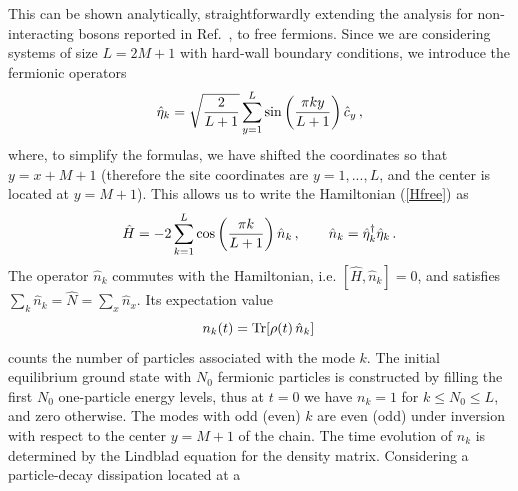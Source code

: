   This can be shown analytically, straightforwardly extending the
  analysis for non-interacting bosons reported in Ref.~\cite{KH-12}, to
  free fermions.  Since we are considering systems of size $L=2M+1$ with
  hard-wall boundary conditions, we introduce the fermionic operators
  \begin{eqnarray}
    \hat \eta_k = \sqrt{2\over L+1}
    \sum_{y=1}^{L} \sin\left({\pi k y \over L+1}\right)
    \hat c_y\,, \label{trafou}
  \end{eqnarray}
  where, to simplify the formulas, we have shifted the coordinates so
  that $y = x + M+1$ (therefore the site coordinates are $y=1,...,L$,
  and the center is located at $y=M+1$).  This allows us to write the
  Hamiltonian (\ref{Hfree}) as
  \begin{equation}
    \hat H = - 2 \sum_{k=1}^L \cos\left({\pi k\over L+1}\right) \hat n_k\,,
    \qquad   \hat n_k = \hat \eta_k^\dagger \hat \eta_k\,.
    \label{Hfreek}
    \end{equation}
  The operator $\hat n_k$ commutes with the Hamiltonian, i.e. $[\hat
    H,\hat n_k] = 0$, and satisfies $\sum_k \hat n_k = \hat N = \sum_x
  \hat n_x$.  Its expectation value 
  \begin{equation}
  n_k(t) = {\rm Tr}[\rho(t)\, \hat n_k]\,
  \label{nkope}
  \end{equation}
  counts the number of particles associated with the mode $k$.  The
  initial equilibrium ground state with $N_0$ fermionic particles is
  constructed by filling the first $N_0$ one-particle energy levels,
  thus at $t=0$ we have $n_k=1$ for $k\le N_0\le L$, and zero
  otherwise. The modes with odd (even) $k$ are even (odd) under
  inversion with respect to the center $y=M+1$ of the chain.  The time
  evolution of $n_k$ is determined by the Lindblad equation for the
  density matrix.  Considering a particle-decay dissipation located at a
